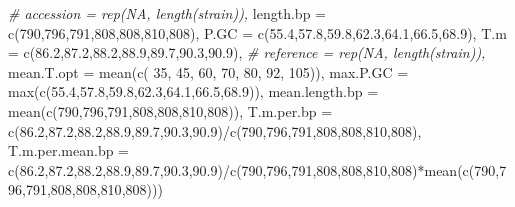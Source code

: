 \documentclass[
]{book}
\newenvironment{Shaded}{\begin{snugshade}}{\end{snugshade}}
\newcommand{\AttributeTok}[1]{\textcolor[rgb]{0.77,0.63,0.00}{#1}}
\newcommand{\CommentTok}[1]{\textcolor[rgb]{0.56,0.35,0.01}{\textit{#1}}}
\newcommand{\DecValTok}[1]{\textcolor[rgb]{0.00,0.00,0.81}{#1}}
\newcommand{\FloatTok}[1]{\textcolor[rgb]{0.00,0.00,0.81}{#1}}
\newcommand{\FunctionTok}[1]{\textcolor[rgb]{0.00,0.00,0.00}{#1}}
\newcommand{\NormalTok}[1]{#1}
\newcommand{\SpecialCharTok}[1]{\textcolor[rgb]{0.00,0.00,0.00}{#1}}
\begin{document}
\begin{Shaded}
\begin{Highlighting}[]
\CommentTok{\# accession = rep(NA, length(strain)), }
\AttributeTok{length.bp =} \FunctionTok{c}\NormalTok{(}\DecValTok{790}\NormalTok{,}\DecValTok{796}\NormalTok{,}\DecValTok{791}\NormalTok{,}\DecValTok{808}\NormalTok{,}\DecValTok{808}\NormalTok{,}\DecValTok{810}\NormalTok{,}\DecValTok{808}\NormalTok{), }
\AttributeTok{P.GC     =} \FunctionTok{c}\NormalTok{(}\FloatTok{55.4}\NormalTok{,}\FloatTok{57.8}\NormalTok{,}\FloatTok{59.8}\NormalTok{,}\FloatTok{62.3}\NormalTok{,}\FloatTok{64.1}\NormalTok{,}\FloatTok{66.5}\NormalTok{,}\FloatTok{68.9}\NormalTok{),     }
\AttributeTok{T.m      =} \FunctionTok{c}\NormalTok{(}\FloatTok{86.2}\NormalTok{,}\FloatTok{87.2}\NormalTok{,}\FloatTok{88.2}\NormalTok{,}\FloatTok{88.9}\NormalTok{,}\FloatTok{89.7}\NormalTok{,}\FloatTok{90.3}\NormalTok{,}\FloatTok{90.9}\NormalTok{),       }
\CommentTok{\# reference =  rep(NA, length(strain)),}
\AttributeTok{mean.T.opt =} \FunctionTok{mean}\NormalTok{(}\FunctionTok{c}\NormalTok{( }\DecValTok{35}\NormalTok{,  }\DecValTok{45}\NormalTok{,  }\DecValTok{60}\NormalTok{,  }\DecValTok{70}\NormalTok{,  }\DecValTok{80}\NormalTok{,  }\DecValTok{92}\NormalTok{,  }\DecValTok{105}\NormalTok{)),}
\AttributeTok{max.P.GC =} \FunctionTok{max}\NormalTok{(}\FunctionTok{c}\NormalTok{(}\FloatTok{55.4}\NormalTok{,}\FloatTok{57.8}\NormalTok{,}\FloatTok{59.8}\NormalTok{,}\FloatTok{62.3}\NormalTok{,}\FloatTok{64.1}\NormalTok{,}\FloatTok{66.5}\NormalTok{,}\FloatTok{68.9}\NormalTok{)),}
\AttributeTok{mean.length.bp =} \FunctionTok{mean}\NormalTok{(}\FunctionTok{c}\NormalTok{(}\DecValTok{790}\NormalTok{,}\DecValTok{796}\NormalTok{,}\DecValTok{791}\NormalTok{,}\DecValTok{808}\NormalTok{,}\DecValTok{808}\NormalTok{,}\DecValTok{810}\NormalTok{,}\DecValTok{808}\NormalTok{)),}
\AttributeTok{T.m.per.bp =} \FunctionTok{c}\NormalTok{(}\FloatTok{86.2}\NormalTok{,}\FloatTok{87.2}\NormalTok{,}\FloatTok{88.2}\NormalTok{,}\FloatTok{88.9}\NormalTok{,}\FloatTok{89.7}\NormalTok{,}\FloatTok{90.3}\NormalTok{,}\FloatTok{90.9}\NormalTok{)}\SpecialCharTok{/}\FunctionTok{c}\NormalTok{(}\DecValTok{790}\NormalTok{,}\DecValTok{796}\NormalTok{,}\DecValTok{791}\NormalTok{,}\DecValTok{808}\NormalTok{,}\DecValTok{808}\NormalTok{,}\DecValTok{810}\NormalTok{,}\DecValTok{808}\NormalTok{),}
\AttributeTok{T.m.per.mean.bp =}  \FunctionTok{c}\NormalTok{(}\FloatTok{86.2}\NormalTok{,}\FloatTok{87.2}\NormalTok{,}\FloatTok{88.2}\NormalTok{,}\FloatTok{88.9}\NormalTok{,}\FloatTok{89.7}\NormalTok{,}\FloatTok{90.3}\NormalTok{,}\FloatTok{90.9}\NormalTok{)}\SpecialCharTok{/}\FunctionTok{c}\NormalTok{(}\DecValTok{790}\NormalTok{,}\DecValTok{796}\NormalTok{,}\DecValTok{791}\NormalTok{,}\DecValTok{808}\NormalTok{,}\DecValTok{808}\NormalTok{,}\DecValTok{810}\NormalTok{,}\DecValTok{808}\NormalTok{)}\SpecialCharTok{*}\FunctionTok{mean}\NormalTok{(}\FunctionTok{c}\NormalTok{(}\DecValTok{790}\NormalTok{,}\DecValTok{796}\NormalTok{,}\DecValTok{791}\NormalTok{,}\DecValTok{808}\NormalTok{,}\DecValTok{808}\NormalTok{,}\DecValTok{810}\NormalTok{,}\DecValTok{808}\NormalTok{)))}
\end{Highlighting}
\end{Shaded}
\end{document}
